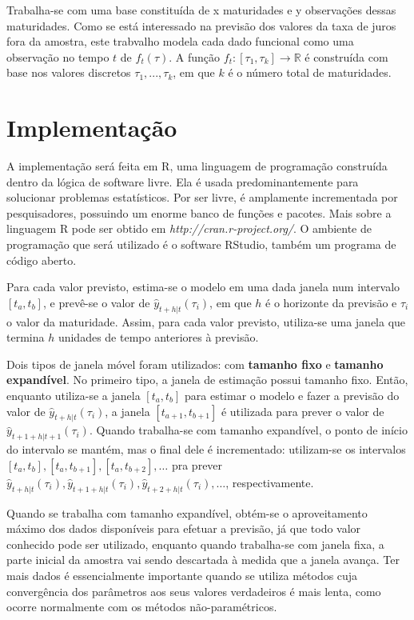 \documentclass[
	12pt,				%
	openright,			%
	oneside,			%
	a4paper,			%
	english,			%
	brazil				%
	]{dissertacao-ufrgs-abntex2}
\begin{document}
Trabalha-se com uma base constituída de x  maturidades e y observações dessas maturidades. Como se está interessado na previsão dos valores da taxa de juros fora da amostra, este trabvalho modela cada dado funcional como uma observação no tempo $t$ de $f_t(\tau)$. A função $f_t:[\tau_1,\tau_k] \rightarrow \mathbb{R}$ é construída com base nos valores discretos ${\tau_1, ..., \tau_k}$, em que $k$ é o número total de maturidades.



\section{Implementação}

A implementação será feita em R, uma linguagem de programação construída dentro da lógica de software livre. Ela é usada predominantemente para solucionar problemas estatísticos. Por ser livre, é amplamente incrementada por pesquisadores, possuindo um enorme banco de funções e pacotes. Mais sobre a linguagem R pode ser obtido em \emph{http://cran.r-project.org/}. O ambiente de programação que será utilizado é o software RStudio, também um programa de código aberto.

Para cada valor previsto, estima-se o modelo em uma dada janela num intervalo $[t_a,t_b]$, e prevê-se o valor de  $\hat{y}_{t+h|t}(\tau_i)$, em que $h$ é o horizonte da previsão e $\tau_i$ o valor da maturidade. Assim, para cada valor previsto, utiliza-se uma janela que termina $h$ unidades de tempo anteriores à previsão.

Dois tipos de janela móvel foram utilizados: com \textbf{tamanho fixo }e \textbf{tamanho expandível}. 
No primeiro tipo, a janela de estimação possui tamanho fixo. Então, enquanto utiliza-se a janela $[t_a,t_b]$ para estimar o modelo e fazer a previsão do valor de $\hat{y}_{t+h|t}(\tau_i)$, a janela $[t_{a+1},t_{b+1}]$ é utilizada para prever o valor de $\hat{y}_{t+1+h|t+1}(\tau_i)$. Quando trabalha-se com tamanho expandível, o ponto de início do intervalo se mantém, mas o final dele é incrementado: utilizam-se os intervalos $[t_{a},t_{b}] ,[t_{a},t_{b+1}],[t_{a},t_{b+2}],\dots$  pra prever $\hat{y}_{t+h|t}(\tau_i),\hat{y}_{t+1+h|t}(\tau_i),\hat{y}_{t+2+h|t}(\tau_i),\dots$, respectivamente.

Quando se trabalha com tamanho expandível, obtém-se o aproveitamento máximo dos dados disponíveis para efetuar a previsão, já que todo valor conhecido pode ser utilizado, enquanto quando trabalha-se com janela fixa, a parte inicial da amostra vai sendo descartada à medida que a janela avança. Ter mais dados é essencialmente importante quando se utiliza métodos cuja convergência dos parâmetros aos seus valores verdadeiros é mais lenta, como ocorre normalmente com os métodos não-paramétricos. 
\end{document}
